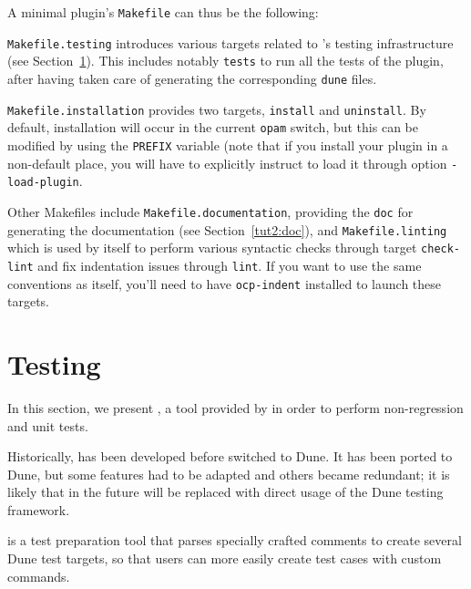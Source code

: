 A minimal plugin's \verb|Makefile| can thus be the following:


\texttt{Makefile.testing} introduces various targets related to \framac's
testing infrastructure (see Section~\ref{adv:ptests}). This includes notably
\texttt{tests} to run all the tests of the plugin, after having taken care of
generating the corresponding \texttt{dune} files.

\texttt{Makefile.installation} provides two targets, \texttt{install} and
\texttt{uninstall}. By default, installation will occur in the current
\texttt{opam} switch, but this can be modified by using the \texttt{PREFIX}
variable (note that if you install your plugin in a non-default place, you will
have to explicitly instruct \framac to load it through option
\texttt{-load-plugin}.

Other Makefiles include \texttt{Makefile.documentation}, providing the
\texttt{doc} for generating the documentation (see Section~\ref{tut2:doc}),
and \texttt{Makefile.linting} which is used
by \framac itself to perform various syntactic checks through target
\texttt{check-lint} and fix indentation issues through \texttt{lint}. If
you want to use the same conventions as \framac itself, you'll need to
have \texttt{ocp-indent} installed to launch these targets.



\section{Testing}\label{adv:ptests}

In this section, we present \ptests, a tool provided by \framac in order to
perform non-regression and unit tests.

\begin{important}
  Historically, \ptests has been developed before \framac switched to Dune.
  It has been ported to Dune, but some features had to be adapted and others
  became redundant; it is likely that in the future \ptests will be
  replaced with direct usage of the Dune testing framework.
\end{important}

\ptests{} is a test preparation tool that parses specially
crafted \C comments to create several Dune test targets, so that users can
more easily create test cases with custom \framac commands.

